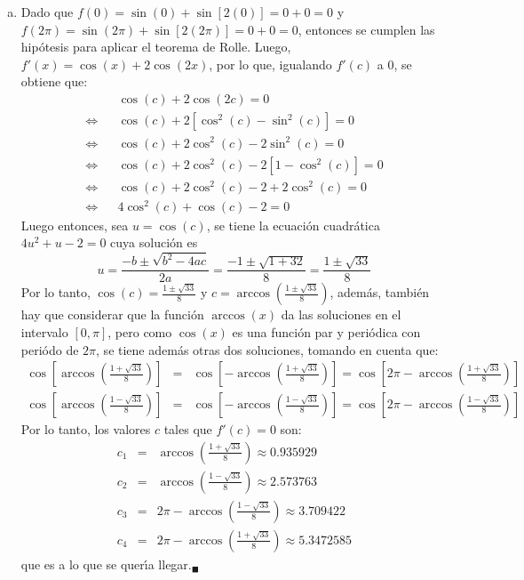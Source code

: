 \begin{solucion}
\begin{enumerate}[(a)]
  \item Dado que $f(0) = \sin(0) + \sin[2(0)] = 0 + 0 = 0$ y $f(2\pi) = \sin(2\pi) + \sin[2(2\pi)] = 0 + 0 = 0$, entonces se cumplen las hip\'otesis para aplicar el teorema de Rolle. Luego, $f'(x) = \cos(x) + 2\cos(2x)$, por lo que, igualando $f'(c)$ a $0$, se obtiene que:
  \begin{eqnarray*}
   & & \cos(c) + 2\cos(2c) = 0 \\
   \Leftrightarrow & & \cos(c) + 2\left[ \cos^2(c) - \sin^2(c) \right] = 0 \\
   \Leftrightarrow & & \cos(c) + 2\cos^2(c) - 2\sin^2(c) = 0 \\ 
   \Leftrightarrow & & \cos(c) + 2\cos^2(c) - 2\left[ 1 - \cos^2(c) \right] = 0 \\
   \Leftrightarrow & & \cos(c) + 2\cos^2(c) - 2 + 2\cos^2(c) = 0 \\
   \Leftrightarrow & & 4\cos^2(c) + \cos(c) - 2 = 0
  \end{eqnarray*}
  Luego entonces, sea $u = \cos(c)$, se tiene la ecuaci\'on cuadr\'atica $4u^2 + u - 2 = 0$ cuya soluci\'on es
  \begin{equation*}
   u = \frac{-b\pm\sqrt{b^2 - 4ac}}{2a} = \frac{-1 \pm \sqrt{1 + 32}}{8} = \frac{1 \pm \sqrt{33}}{8}
  \end{equation*}
  Por lo tanto, $\cos(c) = \frac{1\pm \sqrt{33}}{8}$ y $c = \arccos\left( \frac{1\pm \sqrt{33}}{8} \right)$, adem\'as, tambi\'en hay que considerar que la funci\'on $\arccos(x)$ da las soluciones en el intervalo $[0,\pi]$, pero como $\cos(x)$ es una funci\'on par y peri\'odica con peri\'odo de $2\pi$, se tiene adem\'as otras dos soluciones, tomando en cuenta que:
  \begin{eqnarray*}
   \cos\left[ \arccos\left( \frac{1+ \sqrt{33}}{8} \right) \right] & = & \cos \left[ - \arccos\left( \frac{1+ \sqrt{33}}{8} \right)  \right] = \cos\left[ 2\pi - \arccos\left( \frac{1+ \sqrt{33}}{8} \right) \right] \\
   \cos\left[ \arccos\left( \frac{1- \sqrt{33}}{8} \right) \right] & = & \cos\left[- \arccos\left( \frac{1- \sqrt{33}}{8} \right) \right] = \cos \left[2\pi - \arccos\left( \frac{1- \sqrt{33}}{8} \right) \right]
  \end{eqnarray*}
  Por lo tanto, los valores $c$ tales que $f'(c) = 0$ son:
  \begin{eqnarray*}
   c_1 & = & \arccos\left( \frac{1+ \sqrt{33}}{8} \right) \approx 0.935929 \\
   c_2 & = & \arccos\left( \frac{1- \sqrt{33}}{8} \right) \approx 2.573763 \\
   c_3 & = & 2\pi - \arccos\left( \frac{1- \sqrt{33}}{8} \right) \approx 3.709422 \\
   c_4 & = & 2\pi - \arccos\left( \frac{1+ \sqrt{33}}{8} \right) \approx 5.3472585 
  \end{eqnarray*}
  que es a lo que se quer\'{\i}a llegar.${}_{\blacksquare}$
 \end{enumerate}
\end{solucion}



